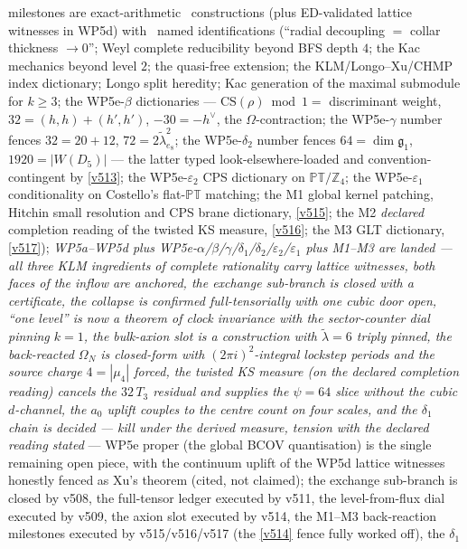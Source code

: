 \documentclass[11pt,a4paper]{article}
\newcommand{\Z}{\mathbb Z}
\begin{document}
\begin{itemize}
milestones are
exact-arithmetic \mE\ constructions
(plus ED-validated lattice witnesses in WP5d) with \mC\ named identifications (``radial
decoupling $=$ collar thickness $\to0$''; Weyl complete reducibility beyond BFS depth $4$; the Kac
mechanics beyond level $2$; the quasi-free extension; the KLM/Longo--Xu/CHMP index dictionary; Longo
split heredity; Kac
generation of the maximal submodule for $k\ge3$; the WP5e-$\beta$ dictionaries ---
$\mathrm{CS}(\rho)\bmod1=$ discriminant weight, $32=(h,h){+}(h',h')$, $-30=-h^\vee$, the
$\Omega$-contraction; the WP5e-$\gamma$ number fences $32=20{+}12$,
$72=2\tilde\lambda^2_{e_8}$; the WP5e-$\delta_2$ number fences $64=\dim\mathfrak g_1$,
$1920=|W(D_5)|$ --- the latter typed look-elsewhere-loaded and convention-contingent by
\vref{v513}; the WP5e-$\varepsilon_2$ CPS dictionary on $\mathbb{PT}/\Z_4$; the
WP5e-$\varepsilon_1$ conditionality on Costello's flat-$\mathbb{PT}$ matching; the M1 global
kernel patching, Hitchin small resolution and CPS brane dictionary, \vref{v515}; the M2
\emph{declared} completion reading of the twisted KS measure, \vref{v516}; the M3 GLT
dictionary, \vref{v517});
\emph{WP5a--WP5d plus WP5e-$\alpha$/$\beta$/$\gamma$/$\delta_1$/$\delta_2$/$\varepsilon_2$/$\varepsilon_1$ plus M1--M3 are landed ---
all three KLM ingredients of complete rationality carry lattice witnesses, both faces of the
inflow are anchored, the exchange sub-branch is closed with a certificate, the collapse is
confirmed full-tensorially with one cubic door open, ``one level'' is
now a theorem of clock invariance with the sector-counter dial pinning $k=1$, the bulk-axion
slot is a construction with $\tilde\lambda=6$ triply pinned, the back-reacted $\Omega_N$ is
closed-form with $(2\pi i)^2$-integral lockstep periods and the source charge $4=|\mu_4|$
forced, the twisted KS measure (on the declared completion reading) cancels the $32\,T_3$
residual and supplies the $\psi=64$ slice without the cubic $d$-channel, the $a_0$ uplift
couples to the centre count on four scales, and the $\delta_1$ chain is decided --- kill under
the derived measure, tension with the declared reading stated}
--- WP5e proper (the global BCOV quantisation) is the single remaining open piece, with the
continuum uplift of the WP5d lattice witnesses honestly fenced as Xu's theorem (cited, not claimed);
the exchange sub-branch is closed by v508, the full-tensor ledger executed by v511, the
level-from-flux dial executed by v509, the axion slot executed by v514, the M1--M3 back-reaction
milestones executed by v515/v516/v517 (the \vref{v514} fence fully worked off), the $\delta_1$

\end{itemize}
\end{document}
